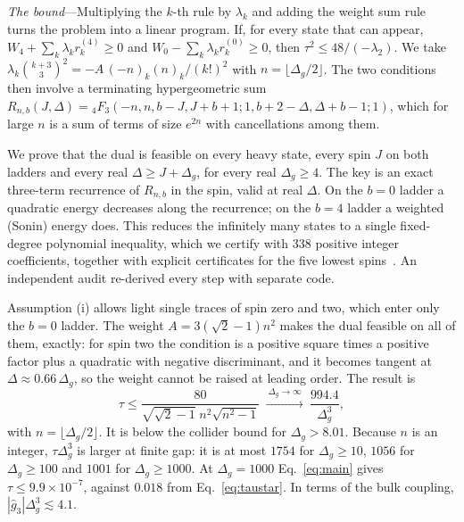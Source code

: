 \documentclass[aps,prl,twocolumn,superscriptaddress,nofootinbib,floatfix]{revtex4-2}
\begin{document}
\textit{The bound}---Multiplying the $k$-th rule by $\lambda_k$ and adding the weight sum rule turns the problem into a linear program.
If, for every state that can appear, $W_4+\sum_k\lambda_kr^{(4)}_k\ge0$ and $W_0-\sum_k\lambda_kr^{(0)}_k\ge0$, then $\tau^2\le48/(-\lambda_2)$.
We take $\lambda_k\binom{k+3}3^2=-A\,(-n)_k(n)_k/(k!)^2$ with $n=\lfloor\Delta_g/2\rfloor$. The two conditions then involve a terminating
hypergeometric sum $R_{n,b}(J,\Delta)={}_4F_3(-n,n,b-J,J+b+1;1,b+2-\Delta,\Delta+b-1;1)$, which for large $n$ is a sum of terms of size
$e^{2n}$ with cancellations among them.

We prove that the dual is feasible on every heavy state, every spin $J$ on both ladders and every real $\Delta\ge J+\Delta_g$, for every real
$\Delta_g\ge4$. The key is an exact three-term recurrence of $R_{n,b}$ in the spin, valid at real $\Delta$. On the $b=0$ ladder a quadratic
energy decreases along the recurrence; on the $b=4$ ladder a weighted (Sonin) energy does. This reduces the infinitely many states to
a single fixed-degree polynomial inequality, which we certify with 338 positive integer coefficients, together with explicit
certificates for the five lowest spins~\cite{SM}. An independent audit re-derived every step with separate code.

Assumption (i) allows light single traces of spin zero and two, which enter only the $b=0$ ladder. The weight $A=3(\sqrt2-1)n^2$ makes
the dual feasible on all of them, exactly: for spin two the condition is a positive square times a positive factor plus a quadratic with
negative discriminant, and it becomes tangent at $\Delta\approx0.66\,\Delta_g$, so the weight cannot be raised at leading order. The result is
\begin{equation}
\tau\le\frac{80}{\sqrt{\sqrt2-1}\;n^2\sqrt{n^2-1}}\ \xrightarrow{\ \Delta_g\to\infty\ }\ \frac{994.4}{\Delta_g^3},
\label{eq:main}
\end{equation}
with $n=\lfloor\Delta_g/2\rfloor$. It is below the collider bound for $\Delta_g>8.01$. Because $n$ is an integer, $\tau\Delta_g^3$ is larger at finite gap: it is at most
$1754$ for $\Delta_g\ge10$, $1056$ for $\Delta_g\ge100$ and $1001$ for $\Delta_g\ge1000$. At $\Delta_g=1000$ Eq.~\eqref{eq:main} gives
$\tau\le9.9\times10^{-7}$, against $0.018$ from Eq.~\eqref{eq:taustar}. In terms of the bulk coupling, $|\hat g_3|\Delta_g^3\lesssim4.1$.
\end{document}
